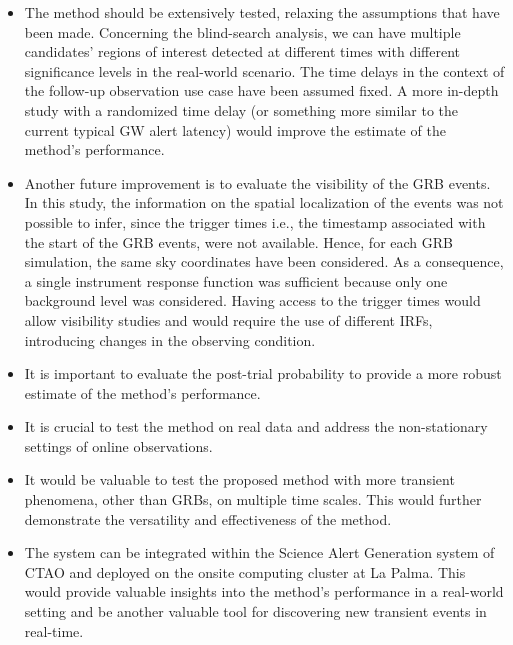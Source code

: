 \begin{itemize}
    
    \item The method should be extensively tested, relaxing the assumptions that have been made. Concerning the blind-search analysis, we can have multiple candidates' regions of interest detected at different times with different significance levels in the real-world scenario. The time delays in the context of the follow-up observation use case have been assumed fixed. A more in-depth study with a randomized time delay (or something more similar to the current typical GW alert latency) would improve the estimate of the method's performance.

    \item Another future improvement is to evaluate the visibility of the GRB events. In this study, the information on the spatial localization of the events was not possible to infer, since the trigger times i.e., the timestamp associated with the start of the GRB events, were not available. Hence, for each GRB simulation, the same sky coordinates have been considered. As a consequence, a single instrument response function was sufficient because only one background level was considered. Having access to the trigger times would allow visibility studies and would require the use of different IRFs, introducing changes in the observing condition.
    
    \item It is important to evaluate the post-trial probability to provide a more robust estimate of the method's performance. 

    \item It is crucial to test the method on real data and address the non-stationary settings of online observations.
    
    \item It would be valuable to test the proposed method with more transient phenomena, other than GRBs, on multiple time scales. This would further demonstrate the versatility and effectiveness of the method.

    \item The system can be integrated within the Science Alert Generation system of CTAO and deployed on the onsite computing cluster at La Palma. This would provide valuable insights into the method's performance in a real-world setting and be another valuable tool for discovering new transient events in real-time. 
    
\end{itemize}
